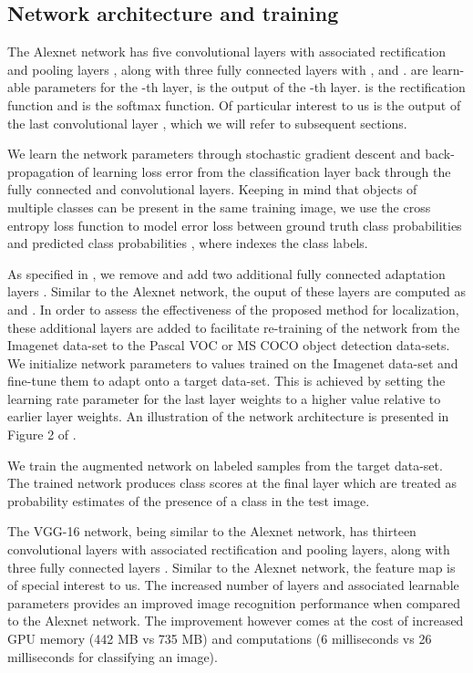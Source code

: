 \documentclass[runningheads]{llncs}
\begin{document}
\subsection{Network architecture and training}\label{subsection:network}
The Alexnet network  has five convolutional layers with associated rectification and  pooling layers , along with three fully connected layers  with ,  and .  are learn-able parameters  for the -th layer,  is the output of the -th layer.  is the rectification function and  is the softmax function. Of particular interest to us is the output of the last convolutional layer ,  which we will refer to subsequent sections.

We learn the network parameters through stochastic gradient descent and back-propagation of learning loss error \cite{rumelhart1988learning} from the classification layer back through the fully connected and convolutional layers. Keeping in mind that objects of multiple classes can be present in the same training image, we use the cross entropy loss function to model error loss  between ground truth class probabilities  and predicted class probabilities , where  indexes the class labels.



As specified in \cite{Oquab14}, we remove  and add two additional fully connected adaptation layers . Similar to the Alexnet network, the ouput of these layers are computed as  and . In order to assess the effectiveness of the proposed method for localization, these additional layers are added to facilitate re-training of the network from the Imagenet data-set to the Pascal VOC or MS COCO object detection data-sets. We  initialize network parameters to values trained on the Imagenet data-set and fine-tune them \cite{karayev2013recognizing} to adapt onto a target data-set. This is achieved by setting the learning rate parameter  for the last layer weights to a higher value relative to earlier layer weights. An illustration of the network architecture is presented in Figure 2 of \cite{Oquab14}.

We train the augmented network on labeled samples from the target data-set. The trained network produces class scores at the final layer which are treated as probability estimates of the presence of a class in the test image.


The VGG-16 network, being similar to the Alexnet network, has thirteen convolutional layers  with associated rectification and  pooling layers, along with three fully connected layers . Similar to the Alexnet network, the feature map  is of special interest to us.
The increased number of layers and associated learnable parameters provides an improved image recognition performance when compared to the Alexnet network. The improvement however comes at the cost of increased GPU memory (442 MB vs 735 MB) and computations (6 milliseconds  vs 26 milliseconds for classifying an image).
\end{document}
